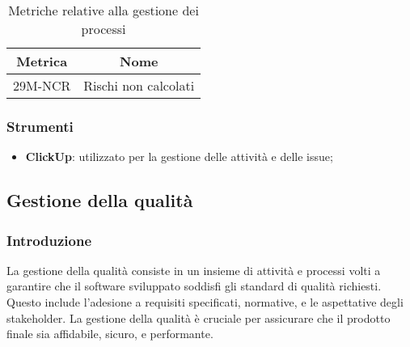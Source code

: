 \begin{table}[h]
	\centering
	\begin{tabular}{|c|c|}
		\hline
		\textbf{Metrica} & \textbf{Nome}        \\
		\hline
		29M-NCR          & Rischi non calcolati \\
		\hline
	\end{tabular}
	\caption{Metriche relative alla gestione dei processi}
\end{table}

\subsubsection{Strumenti}
\begin{itemize}
	\item \textbf{ClickUp}: utilizzato per la gestione delle attività e delle issue;
\end{itemize}

\subsection{Gestione della qualità}
\subsubsection{Introduzione}
La gestione della qualità consiste in un insieme di attività e processi volti a garantire che il software sviluppato soddisfi gli standard di qualità richiesti. Questo include l'adesione a requisiti specificati, normative, e le aspettative degli stakeholder. La gestione della qualità è cruciale per assicurare che il prodotto finale sia affidabile, sicuro, e performante.

